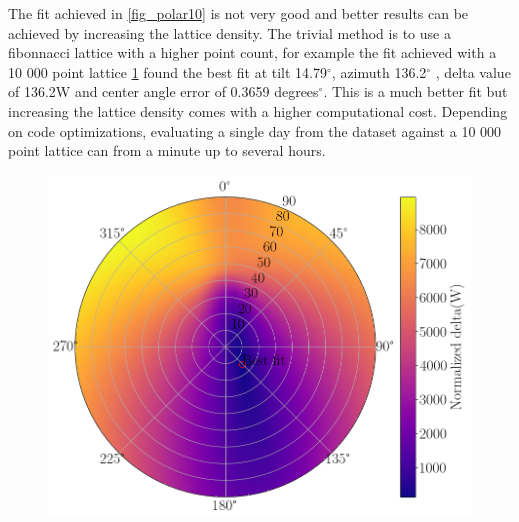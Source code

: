The fit achieved in \ref{fig_polar10} is not very good and better results can be achieved by increasing the lattice density. The trivial method is to use a fibonnacci lattice with a higher point count, for example the fit achieved with a 10 000 point lattice \ref{10k_fits_new_helsinki} found the best fit at tilt 14.79$^\circ$, azimuth 136.2$^\circ$ , delta value of 136.2W and center angle error of 0.3659 degrees$^\circ$. This is a much better fit but increasing the lattice density comes with a higher computational cost. Depending on code optimizations, evaluating a single day from the dataset against a 10 000 point lattice can from a minute up to several hours.

\begin{figure}[h]
\centering
\includegraphics[width=0.8\linewidth]{pics/10k_new_model} %
\label{10k_fits_new_helsinki}
\end{figure}










